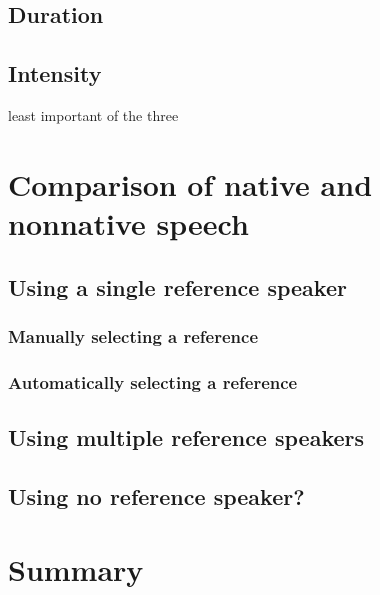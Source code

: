 	\subsection{Duration}
	\subsection{Intensity}
		least important of the three \citep{Cutler2005}
	
\section{Comparison of native and nonnative speech}
		\cite{Probst2002}
	\subsection{Using a single reference speaker}
		\subsubsection{Manually selecting a reference}
		\subsubsection{Automatically selecting a reference}
	\subsection{Using multiple reference speakers}
	\subsection{Using no reference speaker?}
		\cite{Duong2011}

		
\section{Summary}